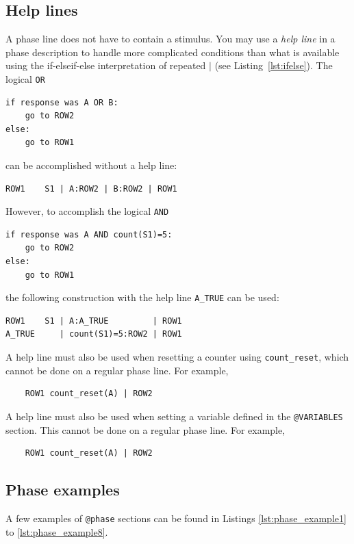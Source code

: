 \documentclass[11pt]{article}
\newcommand{\scr}[1]{\lstinline|#1|}
\begin{document}
\subsection{Help lines}
A phase line does not have to contain a stimulus. 
You may use a \emph{help line} in a phase description to handle more complicated conditions
than what is available using the if-elseif-else interpretation of repeated $|$ (see Listing~\ref{lst:ifelse}). The logical \scr{OR}
\begin{verbatim}
if response was A OR B:
    go to ROW2
else:
    go to ROW1
\end{verbatim}
can be accomplished without a help line:
\begin{verbatim}
ROW1    S1 | A:ROW2 | B:ROW2 | ROW1
\end{verbatim}
However, to accomplish the logical \scr{AND}
\begin{verbatim}
if response was A AND count(S1)=5:
    go to ROW2
else:
    go to ROW1
\end{verbatim}
the following construction with the help line \scr{A_TRUE} can be used:
\begin{verbatim}
ROW1    S1 | A:A_TRUE         | ROW1
A_TRUE     | count(S1)=5:ROW2 | ROW1
\end{verbatim}

A help line must also be used when resetting a counter using \scr{count_reset}, which cannot be done on a regular phase line. For example,
\begin{center}
	\begin{verbatim}
	ROW1 count_reset(A) | ROW2
	\end{verbatim}
\end{center}

A help line must also be used when setting a variable defined in the \verb|@VARIABLES| section. This cannot be done on a regular phase line. For example,
\begin{center}
	\begin{verbatim}
	ROW1 count_reset(A) | ROW2
	\end{verbatim}
\end{center}


\subsection{Phase examples}
A few examples of \verb|@phase| sections can be found in Listings \ref{lst:phase_example1} to \ref{lst:phase_example8}.
\end{document}

